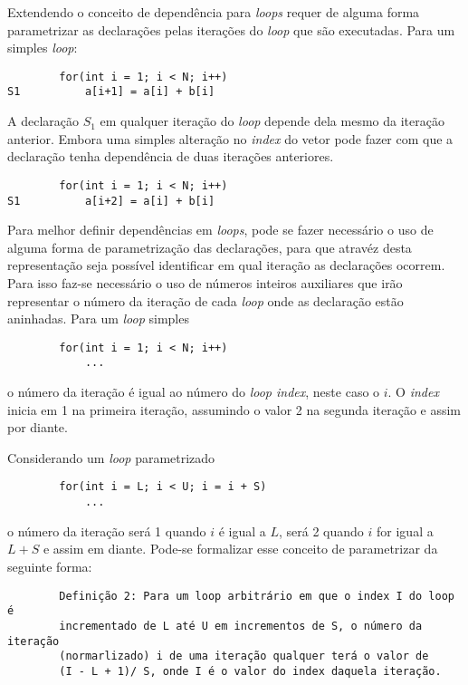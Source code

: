 Extendendo o conceito de dependência para \textit{loops} requer de alguma forma 
parametrizar as declarações pelas iterações do \textit{loop} que são
executadas.
Para um simples \textit{loop}:

\begin{verbatim}
        for(int i = 1; i < N; i++)
S1          a[i+1] = a[i] + b[i]
\end{verbatim}

A declaração $S_1$ em qualquer iteração do \textit{loop} depende dela mesmo da
iteração anterior. Embora uma simples alteração no \textit{index} do vetor pode
fazer com que a declaração tenha dependência de duas iterações anteriores.

\begin{verbatim}
        for(int i = 1; i < N; i++)
S1          a[i+2] = a[i] + b[i]
\end{verbatim}

Para melhor definir dependências em \textit{loops},  pode se fazer necessário o
uso de alguma forma de parametrização das declarações, para que atravéz desta
representação seja possível identificar em qual iteração as declarações ocorrem.
Para isso faz-se necessário o uso de números inteiros auxiliares que irão
representar o número da iteração de cada \textit{loop} onde as declaração estão
aninhadas.
Para um \textit{loop} simples

\begin{verbatim}
        for(int i = 1; i < N; i++)
            ...
\end{verbatim}

o número da iteração é igual ao número do \textit{loop index}, neste caso o $i$.
O \textit{index} inicia em 1 na primeira iteração, assumindo o valor 2 na
segunda iteração e assim por diante.

Considerando um \textit{loop} parametrizado

\begin{verbatim}
        for(int i = L; i < U; i = i + S)
            ...
\end{verbatim}

o número da iteração será 1 quando $i$ é igual a $L$, será 2 quando $i$ for
igual a $L+S$ e assim em diante. Pode-se formalizar esse conceito de
parametrizar da seguinte forma:

\begin{verbatim}
        Definição 2: Para um loop arbitrário em que o index I do loop é
        incrementado de L até U em incrementos de S, o número da iteração
        (normarlizado) i de uma iteração qualquer terá o valor de 
        (I - L + 1)/ S, onde I é o valor do index daquela iteração.
\end{verbatim}



